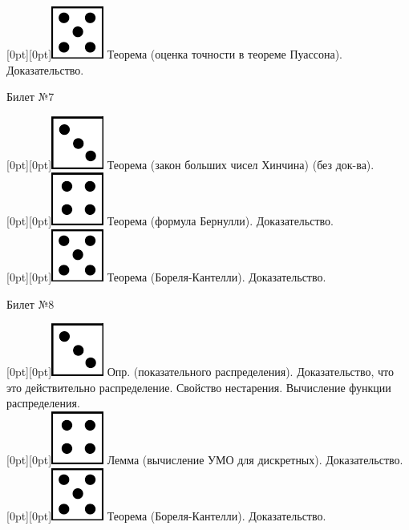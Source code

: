 \documentclass[10pt]{article}
\begin{document}
\raisebox{-1pt}[0pt][0pt]{\includegraphics[width=0.02\linewidth]{5.png}} Теорема (оценка точности в теореме Пуассона). Доказательство. \\

\begin{center} {\Large Билет №7} \end{center} 

\raisebox{-1pt}[0pt][0pt]{\includegraphics[width=0.02\linewidth]{3.png}} Теорема (закон больших чисел Хинчина) (без док-ва). \\

\raisebox{-1pt}[0pt][0pt]{\includegraphics[width=0.02\linewidth]{4.png}} Теорема (формула Бернулли). Доказательство. \\

\raisebox{-1pt}[0pt][0pt]{\includegraphics[width=0.02\linewidth]{5.png}} Теорема (Бореля-Кантелли). Доказательство. \\

\begin{center} {\Large Билет №8} \end{center} 

\raisebox{-1pt}[0pt][0pt]{\includegraphics[width=0.02\linewidth]{3.png}}  Опр. (показательного распределения). Доказательство, что это действительно распределение. Свойство нестарения. Вычисление функции распределения.  \\  

\raisebox{-1pt}[0pt][0pt]{\includegraphics[width=0.02\linewidth]{4.png}} Лемма (вычисление УМО для дискретных). Доказательство. \\

\raisebox{-1pt}[0pt][0pt]{\includegraphics[width=0.02\linewidth]{5.png}} Теорема (Бореля-Кантелли). Доказательство. \\
\end{document}
